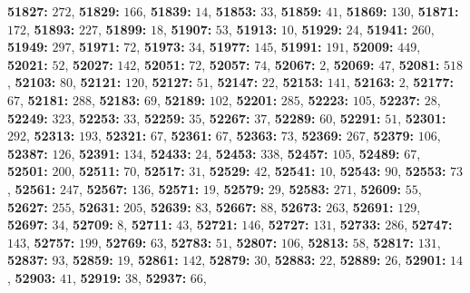 \textsf{\bfseries 51827:} $272$, \textsf{\bfseries 51829:} $166$, \textsf{\bfseries 51839:} $14$, \textsf{\bfseries 51853:} $33$, \textsf{\bfseries 51859:} $41$, \textsf{\bfseries 51869:} $130$, \textsf{\bfseries 51871:} $172$, \textsf{\bfseries 51893:} $227$, \textsf{\bfseries 51899:} $18$, \textsf{\bfseries 51907:} $53$, \textsf{\bfseries 51913:} $10$, \textsf{\bfseries 51929:} $24$, \textsf{\bfseries 51941:} $260$, \textsf{\bfseries 51949:} $297$, \textsf{\bfseries 51971:} $72$, \textsf{\bfseries 51973:} $34$, \textsf{\bfseries 51977:} $145$, \textsf{\bfseries 51991:} $191$, \textsf{\bfseries 52009:} $449$, \textsf{\bfseries 52021:} $52$, \textsf{\bfseries 52027:} $142$, \textsf{\bfseries 52051:} $72$, \textsf{\bfseries 52057:} $74$, \textsf{\bfseries 52067:} $2$, \textsf{\bfseries 52069:} $47$, \textsf{\bfseries 52081:} $518$, \textsf{\bfseries 52103:} $80$, \textsf{\bfseries 52121:} $120$, \textsf{\bfseries 52127:} $51$, \textsf{\bfseries 52147:} $22$, \textsf{\bfseries 52153:} $141$, \textsf{\bfseries 52163:} $2$, \textsf{\bfseries 52177:} $67$, \textsf{\bfseries 52181:} $288$, \textsf{\bfseries 52183:} $69$, \textsf{\bfseries 52189:} $102$, \textsf{\bfseries 52201:} $285$, \textsf{\bfseries 52223:} $105$, \textsf{\bfseries 52237:} $28$, \textsf{\bfseries 52249:} $323$, \textsf{\bfseries 52253:} $33$, \textsf{\bfseries 52259:} $35$, \textsf{\bfseries 52267:} $37$, \textsf{\bfseries 52289:} $60$, \textsf{\bfseries 52291:} $51$, \textsf{\bfseries 52301:} $292$, \textsf{\bfseries 52313:} $193$, \textsf{\bfseries 52321:} $67$, \textsf{\bfseries 52361:} $67$, \textsf{\bfseries 52363:} $73$, \textsf{\bfseries 52369:} $267$, \textsf{\bfseries 52379:} $106$, \textsf{\bfseries 52387:} $126$, \textsf{\bfseries 52391:} $134$, \textsf{\bfseries 52433:} $24$, \textsf{\bfseries 52453:} $338$, \textsf{\bfseries 52457:} $105$, \textsf{\bfseries 52489:} $67$, \textsf{\bfseries 52501:} $200$, \textsf{\bfseries 52511:} $70$, \textsf{\bfseries 52517:} $31$, \textsf{\bfseries 52529:} $42$, \textsf{\bfseries 52541:} $10$, \textsf{\bfseries 52543:} $90$, \textsf{\bfseries 52553:} $73$, \textsf{\bfseries 52561:} $247$, \textsf{\bfseries 52567:} $136$, \textsf{\bfseries 52571:} $19$, \textsf{\bfseries 52579:} $29$, \textsf{\bfseries 52583:} $271$, \textsf{\bfseries 52609:} $55$, \textsf{\bfseries 52627:} $255$, \textsf{\bfseries 52631:} $205$, \textsf{\bfseries 52639:} $83$, \textsf{\bfseries 52667:} $88$, \textsf{\bfseries 52673:} $263$, \textsf{\bfseries 52691:} $129$, \textsf{\bfseries 52697:} $34$, \textsf{\bfseries 52709:} $8$, \textsf{\bfseries 52711:} $43$, \textsf{\bfseries 52721:} $146$, \textsf{\bfseries 52727:} $131$, \textsf{\bfseries 52733:} $286$, \textsf{\bfseries 52747:} $143$, \textsf{\bfseries 52757:} $199$, \textsf{\bfseries 52769:} $63$, \textsf{\bfseries 52783:} $51$, \textsf{\bfseries 52807:} $106$, \textsf{\bfseries 52813:} $58$, \textsf{\bfseries 52817:} $131$, \textsf{\bfseries 52837:} $93$, \textsf{\bfseries 52859:} $19$, \textsf{\bfseries 52861:} $142$, \textsf{\bfseries 52879:} $30$, \textsf{\bfseries 52883:} $22$, \textsf{\bfseries 52889:} $26$, \textsf{\bfseries 52901:} $14$, \textsf{\bfseries 52903:} $41$, \textsf{\bfseries 52919:} $38$, \textsf{\bfseries 52937:} $66$, 
